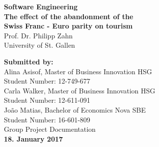 \documentclass[12pt,a4paper,bibliography=totocnumbered,listof=totocnumbered]{scrartcl}
\begin{document}

\renewcommand{\sectionmark}[1]{\markright{#1}}
\renewcommand{\leftmark}{\rightmark}
\pagestyle{fancy}
\lhead{ }
\chead{ }
\rhead{\thesection\space\contentsname}
\cfoot{ }
\renewcommand{\headrulewidth}{0.4pt}
\renewcommand{\footrulewidth}{0.4pt}

\renewcommand{\thesection}{\Roman{section}}
\renewcommand{\theHsection}{\Roman{section}}

\thispagestyle{empty}
\begin{center}
	
	\vspace*{2cm}
	\Huge
	\textbf{Software Engineering}\\
\vfill
	\Large
	\textbf{The effect of the abandonment of the\\Swiss Franc - Euro parity on tourism}\\
\vfill
	\Large
	{Prof. Dr. Philipp Zahn}\\
	\Large
	University of St. Gallen
	
\vfill


\end{center}

\begin{flushleft}	
	\vfill
	\normalsize
\textbf{Submitted by:} \\
Alina Asisof, Master of Business Innovation HSG\\
Student Number: 12-749-677\\ 
Carla Walker, Master of Business Innovation HSG\\ 
Student Number: 12-611-091\\ 

Jo\~ao Matias, Bachelor of Economics Nova SBE\\ 
Student Number: 16-601-809\\ 
\vfill
Group Project Documentation\\ 
 
\vfill
\textbf{18. January 2017}

\end{flushleft}	
\end{document}
